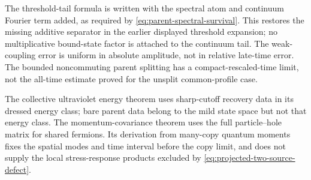 \documentclass[11pt,a4paper,oneside]{book}
\theoremstyle{plain}
\theoremstyle{definition}
\theoremstyle{remark}
\begin{document}
The threshold-tail formula is written with the spectral atom and
continuum Fourier term added, as required by
\eqref{eq:parent-spectral-survival}.  This restores the missing additive
separator in the earlier displayed threshold expansion; no multiplicative
bound-state factor is attached to the continuum tail.  The weak-coupling
error is uniform in absolute amplitude, not in relative late-time error.
The bounded noncommuting parent splitting has a compact-rescaled-time
limit, not the all-time estimate proved for the unsplit common-profile
case.

The collective ultraviolet energy theorem uses sharp-cutoff recovery
data in its dressed energy class; bare parent data belong to the mild
state space but not that energy class.  The momentum-covariance theorem
uses the full particle--hole matrix for shared fermions.  Its derivation
from many-copy quantum moments fixes the spatial modes and time interval
before the copy limit, and does not supply the local stress-response
products excluded by \eqref{eq:projected-two-source-defect}.
\end{document}
